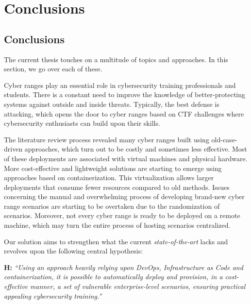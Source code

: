 \chapter{Conclusions}\label{chap:conclusion}

\section{Conclusions} \label{sec:conclusions}

The current thesis touches on a multitude of topics and approaches. In this section, we go over each of these.

Cyber ranges play an essential role in cybersecurity training professionals and students. There is a constant need to improve the knowledge of better-protecting systems against outside and inside threats. Typically, the best defense is attacking, which opens the door to cyber ranges based on CTF challenges where cybersecurity enthusiasts can build upon their skills.

The literature review process revealed many cyber ranges built using old-case-driven approaches, which turn out to be costly and sometimes less effective. Most of these deployments are associated with virtual machines and physical hardware. More cost-effective and lightweight solutions are starting to emerge using approaches based on containerization. This virtualization allows larger deployments that consume fewer resources compared to old methods. Issues concerning the manual and overwhelming process of developing brand-new cyber range scenarios are starting to be overtaken due to the randomization of scenarios. Moreover, not every cyber range is ready to be deployed on a remote machine, which may turn the entire process of hosting scenarios centralized.

Our solution aims to strengthen what the current \textit{state-of-the-art} lacks and revolves upon the following central hypothesis:\\

\leftskip=1.25cm\rightskip=1.25cm

\textbf{H:} \textit{``Using an approach heavily relying upon DevOps, Infrastructure as Code and containerization, it is possible to automatically deploy and provision, in a cost-effective manner, a set of vulnerable enterprise-level scenarios, ensuring practical appealing cybersecurity training.''}\\

\leftskip=0cm\rightskip=0cm

